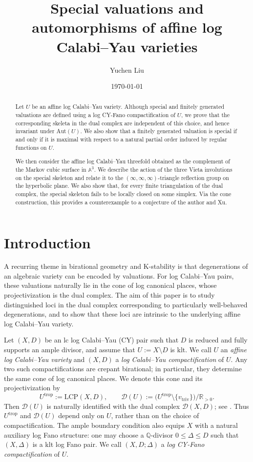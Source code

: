 \documentclass[reqno, 12pt]{amsart}
\title{Special valuations and automorphisms of affine log Calabi--Yau varieties}
\date{\today}
\author{Yuchen Liu}
\theoremstyle{definition}
\newcommand{\bR}{\mathbb{R}}
\newcommand{\bA}{\mathbb{A}}
\newcommand{\bQ}{\mathbb{Q}}
\newcommand{\cD}{\mathcal{D}}
\newcommand{\Aut}{\mathrm{Aut}}
\newcommand{\trop}{\mathrm{trop}}
\newcommand{\triv}{\mathrm{triv}}
\newcommand{\LCP}{\mathrm{LCP}}
\numberwithin{equation}{section}
\begin{document}
\begin{abstract}
Let $U$ be an affine log Calabi--Yau variety. Although special
and finitely generated valuations are defined using a log CY-Fano
compactification of $U$, we prove that the corresponding skeleta
in the dual complex are independent of this choice, and hence
invariant under $\Aut(U)$. We also show that a finitely generated
valuation is special if and only if it is maximal with respect to
a natural partial order induced by regular functions on $U$.

We then consider the affine log Calabi--Yau threefold obtained as the complement of the Markov cubic surface in $\bA^3$. We
describe the action of the three Vieta involutions on the special
skeleton and relate it to the $(\infty,\infty,\infty)$-triangle
reflection group on the hyperbolic plane. We also show that, for every finite triangulation of the dual complex, the special skeleton fails to be locally closed on some simplex. Via the cone construction, this provides
a counterexample to a conjecture of the author and Xu.
\end{abstract}



\maketitle



\tableofcontents

\section{Introduction}

A recurring theme in birational geometry and K-stability is that degenerations of an algebraic variety can be encoded by valuations. For log Calabi--Yau pairs, these valuations naturally lie in the cone of log canonical places, whose projectivization is the dual complex. The aim of this paper is to study distinguished loci in the dual complex corresponding to particularly well-behaved degenerations, and to show
that these loci are intrinsic to the underlying affine log Calabi--Yau variety.


Let $(X,D)$ be an lc log Calabi--Yau (CY) pair such that $D$ is reduced and fully supports an ample divisor, and assume that $U:=X\setminus D $ is klt. We call $U$ an \emph{affine log Calabi--Yau variety} and $(X,D)$ a \emph{log Calabi--Yau compactification} of $U$. Any two such compactifications are crepant birational; in particular, they determine the same cone of log canonical places. We denote this cone and its projectivization by \[ U^{\trop}:=\LCP(X,D), \qquad   \cD(U):= \bigl(U^{\trop}\setminus\{v_{\triv}\}\bigr)/\bR_{>0}. \]
Then $\cD(U)$ is naturally identified with the dual complex $\cD(X,D)$; see \cite{dFKX17, KX15}. Thus $U^{\trop}$ and $\cD(U)$ depend only on $U$, rather than on the choice of compactification.
The ample boundary condition also equips $X$ with a natural auxiliary log Fano structure: one may choose a $\bQ$-divisor $ 0\leq \Delta\leq D $ such that $(X,\Delta)$ is a klt log Fano pair. We call $(X,D;\Delta)$ a \emph{log CY-Fano compactification} of $U$.
\end{document}
